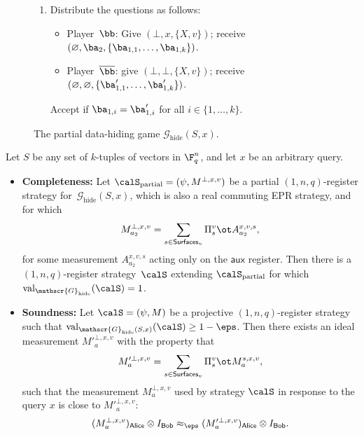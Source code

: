 \documentclass[11pt]{article}
\newcommand{\game}{\mathscr{G}}
\newcommand{\valstrat}[2]{\mathrm{val}_{#1}(#2)}
\newcommand{\reg}[1]{{\mathsf{#1}}}
\newcommand{\surfaces}[1]{\mathsf{Surfaces}_{#1}}
\begin{document}
{\begin{figure}[htpb]
\begin{enumerate}
\begin{itemize}
        \item[$\circ$] Player~$\overline{\bb}$: give $(\bot, \bot, \{X, v\})$; receive
        $(\varnothing,\varnothing, \{\ba_{1,1}', \dots \ba_{1,k}'\})$. 
        \end{itemize}
        Accept if $\ba'_{1,i} = v_i \cdot \ba_1$ for all $i \in \{1,
        \dots, k\}$.
      \item 
        Distribute the questions as follows:
        \begin{itemize}
          \item[$\circ$] Player~$\bb$: Give $(\bot, x, \{X, v\})$;
            receive $(\varnothing, \ba_2, \{\ba_{1,1}, \dots,
            \ba_{1,k}\})$.
          \item[$\circ$] Player~$\overline{\bb}$: give $(\bot,
            \bot, \{X, v\})$; receive $(\varnothing,
            \varnothing, \{\ba'_{1,1}, \dots, \ba'_{1,k}\})$.
          \end{itemize}
          Accept if $\ba_{1,i}  = \ba_{1,i}'$ for all $i \in \{1,
          \dots, k\}$.
      \end{enumerate}

\caption{The partial data-hiding game $\game_{\mathrm{hide}}(S, x)$.\label{fig:hide-observable}}
\end{figure}
}

  

\begin{theorem}  \label{thm:partial-data-hiding-game}
  Let $S$ be any set of $k$-tuples of vectors in
  $\F_q^n$, and let $x$ be an arbitrary query.
  \begin{itemize}
  \item[$\circ$]\textbf{Completeness:}
    Let $\calS_{\mathrm{partial}} = (\psi, M^{\bot, x,v})$ be a partial
    $(1,n,q)$-register strategy for~$\game_{\mathrm{hide}}(S,x)$,
    which is also a real commuting EPR strategy, and for which
    \[ M^{\bot, x,v}_{a_2} = \sum_{s \in \surfaces{v}} \Pi^{v}_s \ot A^{x,v,s}_{a_2}, \]
    for some measurement $A^{x,v,s}_{a_2}$ acting only on the
    $\reg{aux}$ register. Then
    there is a $(1,n,q)$-register strategy~$\calS$ extending
    $\calS_{\mathrm{partial}}$ 
    for which
    $\valstrat{\game_{\mathrm{hide}}}{\calS} = 1$.
    \item[$\circ$]\textbf{Soundness:}
      Let $\calS = (\psi, M)$ be a projective
      $(1,n,q)$-register strategy such that
      $\valstrat{\game_{\mathrm{hide}}(S,x)}{\calS}
      \geq 1 - \eps$. Then there exists an ideal measurement $M'^{\bot, x,
        v}_a$ with
      the property that
      \[ M'^{\bot, x,v }_a = \sum_{s \in \surfaces{v}} \Pi^{v}_s \ot
          M^{s,x, v}_a, \]
      such that  the measurement $M^{\bot, x,v}_a$ used by strategy $\calS$ in
      response to the query $x$  is close to $M'^{\bot, x,v}_a$:
      \[ (M_a^{\bot, x,v})_{\reg{Alice}} \otimes I_{\reg{Bob}} \approx_\eps (M'^{\bot, x,v}_a)_{\reg{Alice}} \otimes I_{\reg{Bob}}. \]
    \end{itemize}
\end{theorem}
\end{document}
